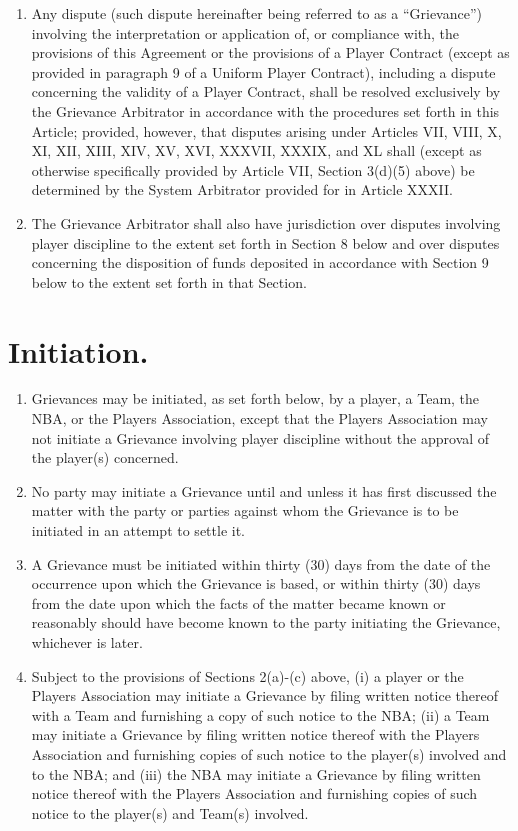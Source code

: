 \documentclass[
]{book}
\providecommand{\tightlist}{%
  \setlength{\itemsep}{0pt}\setlength{\parskip}{0pt}}
\begin{document}
\begin{enumerate}
\def\labelenumi{(\alph{enumi})}
\tightlist
\item
  Any dispute (such dispute hereinafter being referred to as a ``Grievance'') involving the interpretation or application of, or compliance with, the provisions of this Agreement or the provisions of a Player Contract (except as provided in paragraph 9 of a Uniform Player Contract), including a dispute concerning the validity of a Player Contract, shall be resolved exclusively by the Grievance Arbitrator in accordance with the procedures set forth in this Article; provided, however, that disputes arising under Articles VII, VIII, X, XI, XII, XIII, XIV, XV, XVI, XXXVII, XXXIX, and XL shall (except as otherwise specifically provided by Article VII, Section 3(d)(5) above) be determined by the System Arbitrator provided for in Article XXXII.
\item
  The Grievance Arbitrator shall also have jurisdiction over disputes involving player discipline to the extent set forth in Section 8 below and over disputes concerning the disposition of funds deposited in accordance with Section 9 below to the extent set forth in that Section.
\end{enumerate}

\hypertarget{initiation.}{%
\section{Initiation.}\label{initiation.}}

\begin{enumerate}
\def\labelenumi{(\alph{enumi})}
\tightlist
\item
  Grievances may be initiated, as set forth below, by a player, a Team, the NBA, or the Players Association, except that the Players Association may not initiate a Grievance involving player discipline without the approval of the player(s) concerned.
\item
  No party may initiate a Grievance until and unless it has first discussed the matter with the party or parties against whom the Grievance is to be initiated in an attempt to settle it.
\item
  A Grievance must be initiated within thirty (30) days from the date of the occurrence upon which the Grievance is based, or within thirty (30) days from the date upon which the facts of the matter became known or reasonably should have become known to the party initiating the Grievance, whichever is later.
\item
  Subject to the provisions of Sections 2(a)-(c) above, (i) a player or the Players Association may initiate a Grievance by filing written notice thereof with a Team and furnishing a copy of such notice to the NBA; (ii) a Team may initiate a Grievance by filing written notice thereof with the Players Association and furnishing copies of such notice to the player(s) involved and to the NBA; and (iii) the NBA may initiate a Grievance by filing written notice thereof with the Players Association and furnishing copies of such notice to the player(s) and Team(s) involved.
\end{enumerate}
\end{document}
